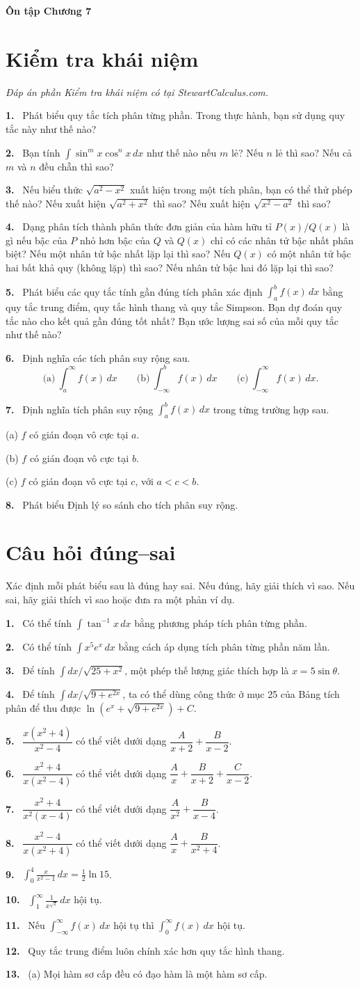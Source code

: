 \documentclass[12pt,a4paper]{article}
\newcommand{\bt}[1]{\par\smallskip\Needspace{5\baselineskip}\noindent\textbf{#1.}\ }
\newcommand{\kn}[1]{\bt{#1}}
\newcommand{\ds}[1]{\bt{#1}}
\begin{document}
\begin{center}{\Large\bfseries Ôn tập Chương 7}\end{center}
\section*{Kiểm tra khái niệm}
\textit{Đáp án phần Kiểm tra khái niệm có tại StewartCalculus.com.}
\kn{1} Phát biểu quy tắc tích phân từng phần. Trong thực hành, bạn sử dụng quy tắc này như thế nào?
\kn{2} Bạn tính $\int\sin^m x\cos^n x\,dx$ như thế nào nếu $m$ lẻ? Nếu $n$ lẻ thì sao? Nếu cả $m$ và $n$ đều chẵn thì sao?
\kn{3} Nếu biểu thức $\sqrt{a^2-x^2}$ xuất hiện trong một tích phân, bạn có thể thử phép thế nào? Nếu xuất hiện $\sqrt{a^2+x^2}$ thì sao? Nếu xuất hiện $\sqrt{x^2-a^2}$ thì sao?
\kn{4} Dạng phân tích thành phân thức đơn giản của hàm hữu tỉ $P(x)/Q(x)$ là gì nếu bậc của $P$ nhỏ hơn bậc của $Q$ và $Q(x)$ chỉ có các nhân tử bậc nhất phân biệt? Nếu một nhân tử bậc nhất lặp lại thì sao? Nếu $Q(x)$ có một nhân tử bậc hai bất khả quy (không lặp) thì sao? Nếu nhân tử bậc hai đó lặp lại thì sao?
\kn{5} Phát biểu các quy tắc tính gần đúng tích phân xác định $\int_a^b f(x)\,dx$ bằng quy tắc trung điểm, quy tắc hình thang và quy tắc Simpson. Bạn dự đoán quy tắc nào cho kết quả gần đúng tốt nhất? Bạn ước lượng sai số của mỗi quy tắc như thế nào?
\kn{6} Định nghĩa các tích phân suy rộng sau.
\[\text{(a)}\ \int_a^\infty f(x)\,dx\qquad \text{(b)}\ \int_{-\infty}^b f(x)\,dx\qquad \text{(c)}\ \int_{-\infty}^\infty f(x)\,dx.\]
\kn{7} Định nghĩa tích phân suy rộng $\int_a^b f(x)\,dx$ trong từng trường hợp sau.

(a) $f$ có gián đoạn vô cực tại $a$.

(b) $f$ có gián đoạn vô cực tại $b$.

(c) $f$ có gián đoạn vô cực tại $c$, với $a<c<b$.
\kn{8} Phát biểu Định lý so sánh cho tích phân suy rộng.
\section*{Câu hỏi đúng–sai}
Xác định mỗi phát biểu sau là đúng hay sai. Nếu đúng, hãy giải thích vì sao. Nếu sai, hãy giải thích vì sao hoặc đưa ra một phản ví dụ.
\ds{1} Có thể tính $\int\tan^{-1}x\,dx$ bằng phương pháp tích phân từng phần.
\ds{2} Có thể tính $\int x^5e^x\,dx$ bằng cách áp dụng tích phân từng phần năm lần.
\ds{3} Để tính $\int dx/\sqrt{25+x^2}$, một phép thế lượng giác thích hợp là $x=5\sin\theta$.
\ds{4} Để tính $\int dx/\sqrt{9+e^{2x}}$, ta có thể dùng công thức ở mục 25 của Bảng tích phân để thu được $\ln(e^x+\sqrt{9+e^{2x}})+C$.
\ds{5} $\dfrac{x(x^2+4)}{x^2-4}$ có thể viết dưới dạng $\dfrac A{x+2}+\dfrac B{x-2}$.
\ds{6} $\dfrac{x^2+4}{x(x^2-4)}$ có thể viết dưới dạng $\dfrac Ax+\dfrac B{x+2}+\dfrac C{x-2}$.
\ds{7} $\dfrac{x^2+4}{x^2(x-4)}$ có thể viết dưới dạng $\dfrac A{x^2}+\dfrac B{x-4}$.
\ds{8} $\dfrac{x^2-4}{x(x^2+4)}$ có thể viết dưới dạng $\dfrac Ax+\dfrac B{x^2+4}$.
\ds{9} $\displaystyle\int_0^4\frac{x}{x^2-1}\,dx=\frac12\ln15$.
\ds{10} $\displaystyle\int_1^\infty\frac1{x^{\sqrt2}}\,dx$ hội tụ.
\ds{11} Nếu $\int_{-\infty}^\infty f(x)\,dx$ hội tụ thì $\int_0^\infty f(x)\,dx$ hội tụ.
\ds{12} Quy tắc trung điểm luôn chính xác hơn quy tắc hình thang.
\ds{13} (a) Mọi hàm sơ cấp đều có đạo hàm là một hàm sơ cấp.
\end{document}
